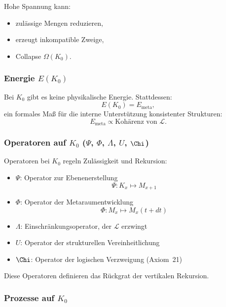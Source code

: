 Hohe Spannung kann:
\begin{itemize}
    \item zulässige Mengen reduzieren,
    \item erzeugt inkompatible Zweige,
    \item Collapse $\Omega(K_0)$.
\end{itemize}

\subsubsection{Energie \texorpdfstring{$E(K_0)$}{E(K_0)}}

Bei $K_0$ gibt es keine physikalische Energie.
Stattdessen:
\[
E(K_0) = E_{\mathrm{meta}},
\]
ein formales Maß für die interne Unterstützung konsistenter Strukturen:
\[
E_{\mathrm{meta}} \propto \text{Kohärenz von }\mathcal{L}.
\]

\subsubsection{Operatoren auf \texorpdfstring{$K_0$}{K_0} (\texorpdfstring{$\Psi$}{\Psi}, \texorpdfstring{$\Phi$}{\Phi}, \texorpdfstring{$\Lambda$}{\Lambda}, \texorpdfstring{$U$}{U}, \texorpdfstring{$\Chi$}{\Chi})}

Operatoren bei $K_0$ regeln Zulässigkeit und Rekursion:

\begin{itemize}
    \item $\Psi$: Operator zur Ebenenerstellung
          \[
          \Psi: K_x \mapsto M_{x+1}
          \]
    \item $\Phi$: Operator der Metaraumentwicklung
          \[
          \Phi: M_x \mapsto M_x(t+dt)
          \]
    \item $\Lambda$: Einschränkungsoperator, der $\mathcal{L}$ erzwingt
    \item $U$: Operator der strukturellen Vereinheitlichung
    \item $\Chi$: Operator der logischen Verzweigung (Axiom~21)
\end{itemize}

Diese Operatoren definieren das Rückgrat der vertikalen Rekursion.

\subsubsection{Prozesse auf \texorpdfstring{$K_0$}{K_0}}

